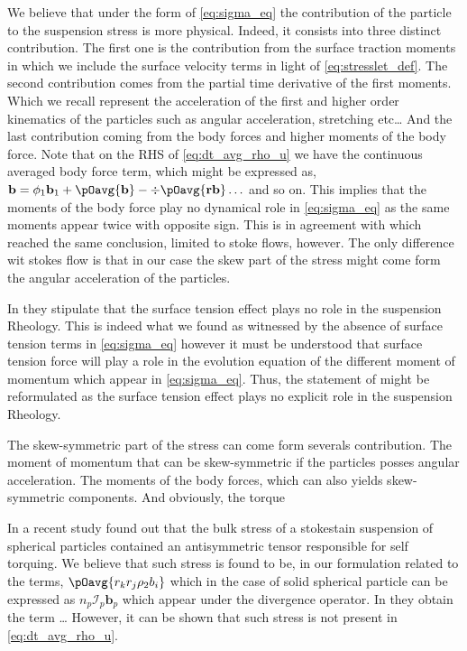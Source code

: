 We believe that under the form of \ref{eq:sigma_eq} the contribution of the particle to the suspension stress is more physical. 
Indeed, it consists into three distinct contribution. 
The first one is the contribution from the surface traction moments in which we include the surface velocity terms in light of \ref{eq:stresslet_def}. 
The second contribution comes from the partial time derivative of the first moments. 
Which we recall represent the acceleration of the first and higher order kinematics   of the particles such as angular acceleration, stretching etc\ldots
And the last contribution coming from the body forces and higher moments of the body force. 
Note that on the RHS of \ref{eq:dt_avg_rho_u} we have the continuous averaged body force term, which might be expressed as, 
$
    \textbf{b}
    = \phi_1 \textbf{b}_1 
    + \pOavg{\textbf{b}}
    - \div \pOavg{\textbf{r} \textbf{b}}
    \ldots
$
and so on. 
This implies that the moments of the body force play no dynamical role in \ref{eq:sigma_eq} as the same moments appear twice with opposite sign. 
This is in agreement with \citet{dolata2020heterogeneous} which reached the same conclusion, limited to stoke flows, however. 
The only difference wit stokes flow is that in our case the skew part of the stress might come form the angular acceleration of the particles. 

In \citet{dolata2020heterogeneous} they stipulate that the surface tension effect plays no role in the suspension Rheology. 
This is indeed what we found as witnessed by the absence of surface tension terms in \ref{eq:sigma_eq} however it must be understood that surface tension force will play a role in the evolution equation of the different moment of momentum which appear in \ref{eq:sigma_eq}. 
Thus, the statement of \citet{dolata2020heterogeneous} might be reformulated as the surface tension effect plays no explicit role in the suspension Rheology. 

The skew-symmetric part of the stress can come form severals contribution. 
The moment of momentum that can be skew-symmetric if the particles posses angular acceleration. 
The moments of the body forces, which can also yields skew-symmetric components. 
And obviously, the torque 

In a recent study \citet{wolgemuth2023continuum} found out that the bulk stress of a stokestain suspension of spherical particles contained an antisymmetric tensor responsible for self torquing. 
We believe that such stress is found to be, in our formulation related to the terms, $\pOavg{r_{k}r_{j}  \rho_2 b_i }$ which in the case of solid spherical particle can be expressed as $n_p\mathcal{I}_p \textbf{b}_p$ which appear under the divergence operator. 
In \citet{wolgemuth2023continuum} they obtain the term \ldots
However, it can be shown that such stress is not present in \ref{eq:dt_avg_rho_u}. 

